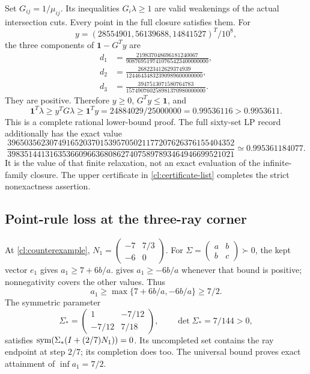 Set $G_{ij}=1/\mu_{ij}$. Its inequalities $G_i\lambda\ge1$ are valid
weakenings of the actual intersection cuts. Every point in the full
closure satisfies them. For
\[
 y=(28554901,56139688,14841527)^T/10^8,
\]
the three components of $\mathbf1-G^Ty$ are
\[
 \begin{aligned}
 d_1&=\frac{219837048696181240067}{9087695197410765423400000000},\\
 d_2&=\frac{268223412629374939}{12446434832390989600000000},\\
 d_3&=\frac{3947513071580764783}{157490760258981370980000000}.
 \end{aligned}
\]
They are positive. Therefore $y\ge0$, $G^Ty\le\mathbf1$, and
\[
 \mathbf1^T\lambda\ge y^TG\lambda\ge\mathbf1^Ty
 =24884029/25000000=0.99536116>0.9953611.
\]
This is a complete rational lower-bound proof. The full sixty-set LP
record additionally has the exact value
\[
 \frac{396503562307491652037015395705021177207626376155404352}
 {398351441316353660966368086274075897893464946699521021}
 \simeq0.995361184077.
\]
It is the value of that finite relaxation, not an exact evaluation of the
infinite-family closure. The upper certificate in
\cref{cl:certificate-list} completes the strict nonexactness assertion.

\subsection{Point-rule loss at the three-ray corner}\label{cl:bp-factor}

At \cref{cl:counterexample},
$N_1=\left(\begin{smallmatrix}-7&7/3\\-6&0\end{smallmatrix}\right)$.
For $\Sigma=\left(\begin{smallmatrix}a&b\\b&c\end{smallmatrix}\right)\succ0$,
the kept vector $e_1$ gives $a_1\ge7+6b/a$.
 gives $a_1\ge-6b/a$ whenever that bound is
positive; nonnegativity covers the other values. Thus
\[
 a_1\ge\max\{7+6b/a,-6b/a\}\ge7/2.
\]
The symmetric parameter
\[
 \Sigma_*=
 \begin{pmatrix}1&-7/12\\-7/12&7/18\end{pmatrix},\qquad
 \det\Sigma_*=7/144>0,
\]
satisfies $\operatorname{sym}(\Sigma_*(I+(2/7)N_1))=0$.
Its uncompleted set contains the ray endpoint at step $2/7$; its
completion does too. The universal bound proves exact attainment of
$\inf a_1=7/2$.

